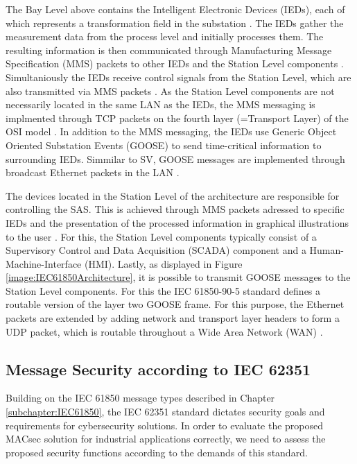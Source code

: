 \documentclass[conference, onecolumn, a4paper]{IEEEtran}
\begin{document}
\smallskip
The Bay Level above contains the Intelligent Electronic Devices (IEDs), each of which represents a transformation field in the substation 
\cite[p. 39]{IEC61850-7-1:2011}. The IEDs gather the measurement data from the process level and initially processes them. The resulting information 
is then communicated through Manufacturing Message Specification (MMS) packets to other IEDs and the Station Level components \cite[p. 44]{IEC61850-8-1:2011}. 
Simultaniously the IEDs receive control signals from the Station Level, which are also transmitted via MMS packets \cite{trafficGen_IEC61850:2011}. 
As the Station Level components are not necessarily located in the same LAN as the IEDs, the MMS messaging is implmented through TCP packets on the 
fourth layer (=Transport Layer) of the OSI model \cite[p. 45]{IEC61850-8-1:2011}. In addition to the MMS messaging, the IEDs use Generic Object 
Oriented Substation Events (GOOSE) to send time-critical information to surrounding IEDs. Simmilar to SV, GOOSE messages are implemented through 
broadcast Ethernet packets in the LAN \cite{GOOSE_confidentiality_integrity:2020}.

\smallskip
The devices located in the Station Level of the architecture are responsible for controlling the SAS. This is achieved through MMS packets adressed 
to specific IEDs and the presentation of the processed information in graphical illustrations to the user \cite{SGRWin_IEC61850Architecture:2021}. 
For this, the Station Level components typically consist of a Supervisory Control and Data Acquisition (SCADA) component and a Human-Machine-Interface 
(HMI). Lastly, as displayed in Figure \ref{image:IEC61850Architecture}, it is possible to transmit GOOSE messages to the Station Level components. 
For this the IEC 61850-90-5 standard \cite{IEC61850-90-5:2012} defines a routable version of the layer two GOOSE frame. For this purpose, the Ethernet 
packets are extended by adding network and transport layer headers to form a UDP packet, which is routable throughout a Wide Area Network (WAN) 
\cite{routable_GOOSE_SV:2020}.

\subsection{Message Security according to IEC 62351}
\noindent Building on the IEC 61850 message types described in Chapter \ref{subchapter:IEC61850}, the IEC 62351 standard \cite{IEC62351:2024} dictates 
security goals and requirements for cybersecurity solutions. In order to evaluate the proposed MACsec solution for industrial applications correctly, 
we need to assess the proposed security functions according to the demands of this standard.
\end{document}
